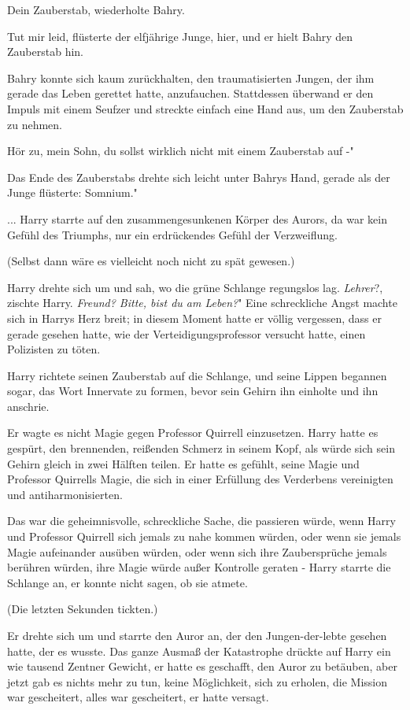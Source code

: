\glqq{}Dein Zauberstab\grqq{}, wiederholte Bahry.

\glqq{}Tut mir leid\grqq{}, flüsterte der elfjährige Junge, \glqq{}hier\grqq{},
und er hielt Bahry den Zauberstab hin.

Bahry konnte sich kaum zurückhalten, den traumatisierten Jungen, der ihm gerade
das Leben gerettet hatte, anzufauchen. Stattdessen überwand er den Impuls mit
einem Seufzer und streckte einfach eine Hand aus, um den Zauberstab zu nehmen.

\glqq{}Hör zu, mein Sohn, du sollst wirklich nicht mit einem Zauberstab auf -"

Das Ende des Zauberstabs drehte sich leicht unter Bahrys Hand, gerade als der
Junge flüsterte: \glqq{}Somnium."

... Harry starrte auf den zusammengesunkenen Körper des Aurors, da war kein
Gefühl des Triumphs, nur ein erdrückendes Gefühl der Verzweiflung.

(Selbst dann wäre es vielleicht noch nicht zu spät gewesen.)

Harry drehte sich um und sah, wo die grüne Schlange regungslos lag. \glqq
\emph{Lehrer}?\grqq{}, zischte Harry. \glqq{}\emph{Freund? Bitte, bist du am
Leben?}" Eine schreckliche Angst machte sich in Harrys Herz breit; in diesem
Moment hatte er völlig vergessen, dass er gerade gesehen hatte, wie der
Verteidigungsprofessor versucht hatte, einen Polizisten zu töten.

Harry richtete seinen Zauberstab auf die Schlange, und seine Lippen begannen
sogar, das Wort Innervate zu formen, bevor sein Gehirn ihn einholte und ihn
anschrie.

Er wagte es nicht Magie gegen Professor Quirrell einzusetzen. Harry hatte es
gespürt, den brennenden, reißenden Schmerz in seinem Kopf, als würde sich sein
Gehirn gleich in zwei Hälften teilen. Er hatte es gefühlt, seine Magie und
Professor Quirrells Magie, die sich in einer Erfüllung des Verderbens
vereinigten und antiharmonisierten.

Das war die geheimnisvolle, schreckliche Sache, die passieren würde, wenn Harry
und Professor Quirrell sich jemals zu nahe kommen würden, oder wenn sie jemals
Magie aufeinander ausüben würden, oder wenn sich ihre Zaubersprüche jemals
berühren würden, ihre Magie würde außer Kontrolle geraten - Harry starrte die
Schlange an, er konnte nicht sagen, ob sie atmete.

(Die letzten Sekunden tickten.)

Er drehte sich um und starrte den Auror an, der den Jungen-der-lebte gesehen
hatte, der es wusste. Das ganze Ausmaß der Katastrophe drückte auf Harry ein wie
tausend Zentner Gewicht, er hatte es geschafft, den Auror zu betäuben, aber
jetzt gab es nichts mehr zu tun, keine Möglichkeit, sich zu erholen, die Mission
war gescheitert, alles war gescheitert, er hatte versagt.

